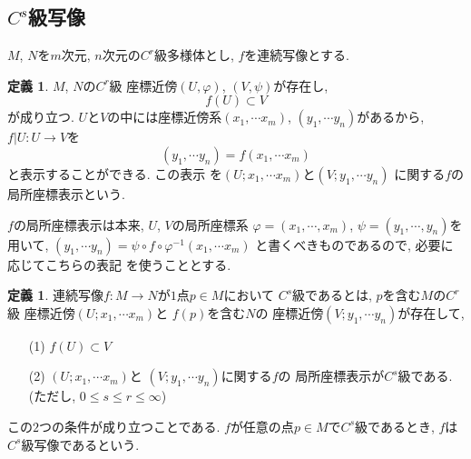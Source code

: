 \documentclass[a4j,12pt]{jarticle}
\theoremstyle{definition}
\newtheorem{definition}[theorem]{定義}
\begin{document}
\subsection{$C^s$級写像}
$M$, $N$を$m$次元, $n$次元の$C^r$級多様体とし, 
$f$を連続写像とする. 
\begin{definition}\label{def:local coordinate display}
$M$, $N$の$C^r$級
座標近傍$(U,\varphi)$, 
$(V,\psi)$が存在し, 
$$f(U)\subset V$$
が成り立つ. 
$U$と$V$の中には座標近傍系$(x_1,\cdots x_m)$, 
$(y_1,\cdots y_n)$があるから, 
$f|U:U\to V$を
$$(y_1,\cdots y_n)=
f(x_1,\cdots x_m)$$
と表示することができる. この表示
を$(U;x_1,\cdots x_m)$と$(V;y_1,\cdots y_n)$
に関する$f$の局所座標表示という. 
\end{definition}
$f$の局所座標表示は本来, $U$, $V$の局所座標系
$\varphi=(x_1,\cdots ,x_m)$, 
$\psi=(y_1,\cdots ,y_n)$を用いて, 
$(y_1,\cdots y_n)=
\psi \circ f\circ \varphi^{-1}(x_1,\cdots x_m)$
と書くべきものであるので, 必要に応じてこちらの表記
を使うこととする. 
\begin{definition}\label{def:C^s map}
    連続写像$f:M\to N$が$1$点$p\in M$において
    $C^s$級であるとは, $p$を含む$M$の$C^r$級
    座標近傍$(U;x_1,\cdots x_m)$と
    $f(p)$を含む$N$の
    座標近傍$(V;y_1,\cdots y_n)$が存在して, 
    \begin{itemize}
        \item[(1)]$f(U)\subset V$
        \item[(2)]$(U;x_1,\cdots x_m)$と
        $(V;y_1,\cdots y_n)$に関する$f$の
        局所座標表示が$C^s$級である.
        (ただし, $0\leq s \leq r \leq \infty$) 
    \end{itemize}
    この$2$つの条件が成り立つことである. 
    $f$が任意の点$p\in M$で$C^s$級であるとき, 
    $f$は$C^s$級写像であるという. 
\end{definition}
\end{document}
